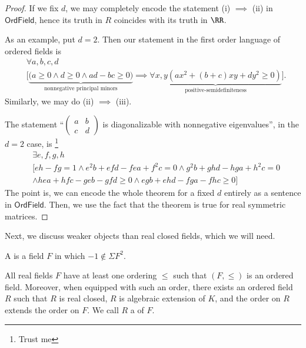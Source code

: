 \documentclass{article}
\newcommand*\OrdField{\mathsf{OrdField}}
\begin{document}
\begin{proof}
    If we fix $d$, we may completely encode the statement (i) $\implies$ (ii) in $\OrdField$, hence its truth in $R$ coincides with its truth in $\RR$.

    As an example, put $d = 2$.
    Then our statement in the first order language of ordered fields is
    \begin{align*}
        &\forall a,b,c,d \\
        &\Bigg[
            \underbrace{
                \Big(
                    a \geq 0 
                    \wedge d \geq 0
                    \wedge ad - bc \geq 0
                \Big)
            }_{\text{nonnegative principal minors}}
            \implies
            \underbrace{
                \forall x,y
                \left(
                    ax^2 + (b+c)xy + dy^2 \geq 0
                \right)
            }_{\text{positive-semidefiniteness}}
        \Bigg].
    \end{align*}
    Similarly, we may do (ii) $\implies$ (iii).

    The statement ``$\begin{pmatrix}a & b \\ c & d\end{pmatrix}$ is diagonalizable with nonnegative eigenvalues'', in the $d=2$ case, is \footnote{Trust me}
    \begin{align*}
        &\exists e,f,g,h \\
        &\Bigg[
        eh - fg = 1
        \wedge e^2b + efd - fea + f^2c = 0
        \wedge g^2b + ghd - hga + h^2c = 0
        \\
        &\wedge hea + hfc - geb - gfd \geq 0
        \wedge egb + ehd - fga - fhc \geq 0
        \Bigg]
    \end{align*}
    The point is, we can encode the whole theorem for a fixed $d$ entirely as a sentence in $\OrdField$.
    Then, we use the fact that the theorem is true for real symmetric matrices.
\end{proof}

Next, we discuss weaker objects than real closed fields, which we will need.

\begin{definition}
    A  is a field $F$ in which $-1 \notin \Sigma F^2$.
\end{definition}

\begin{proposition}
    All real fields $F$ have at least one ordering $\leq$ such that $(F, \leq)$ is an ordered field.
    Moreover, when equipped with such an order, there exists an ordered field $R$ such that $R$ is real closed, $R$ is algebraic extension of $K$, and the order on $R$ extends the order on $F$.
    We call $R$ a  of $F$.
\end{proposition}
\end{document}
